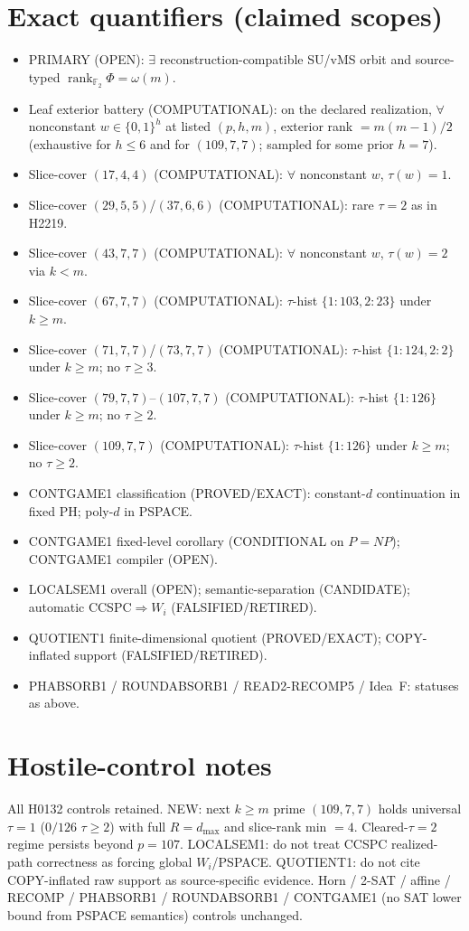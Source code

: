 \documentclass[11pt]{article}
\begin{document}
\section*{Exact quantifiers (claimed scopes)}
\begin{itemize}
\item PRIMARY (OPEN): $\exists$ reconstruction-compatible SU/vMS orbit and source-typed
  $\operatorname{rank}_{\mathbb F_2}\Phi=\omega(m)$.
\item Leaf exterior battery (COMPUTATIONAL): on the declared realization, $\forall$ nonconstant
  $w\in\{0,1\}^h$ at listed $(p,h,m)$, exterior rank $=m(m-1)/2$
  (exhaustive for $h\le6$ and for $(109,7,7)$; sampled for some prior $h{=}7$).
\item Slice-cover $(17,4,4)$ (COMPUTATIONAL): $\forall$ nonconstant $w$, $\tau(w)=1$.
\item Slice-cover $(29,5,5)$/$(37,6,6)$ (COMPUTATIONAL): rare $\tau{=}2$ as in H2219.
\item Slice-cover $(43,7,7)$ (COMPUTATIONAL): $\forall$ nonconstant $w$, $\tau(w)=2$ via $k{<}m$.
\item Slice-cover $(67,7,7)$ (COMPUTATIONAL): $\tau$-hist $\{1{:}103,2{:}23\}$ under $k{\ge}m$.
\item Slice-cover $(71,7,7)$/$(73,7,7)$ (COMPUTATIONAL): $\tau$-hist $\{1{:}124,2{:}2\}$ under $k{\ge}m$;
  no $\tau{\ge}3$.
\item Slice-cover $(79,7,7)$--$(107,7,7)$ (COMPUTATIONAL): $\tau$-hist $\{1{:}126\}$ under $k{\ge}m$;
  no $\tau{\ge}2$.
\item Slice-cover $(109,7,7)$ (COMPUTATIONAL): $\tau$-hist $\{1{:}126\}$ under $k{\ge}m$;
  no $\tau{\ge}2$.
\item CONTGAME1 classification (PROVED/EXACT): constant-$d$ continuation in fixed PH;
  poly-$d$ in PSPACE.
\item CONTGAME1 fixed-level corollary (CONDITIONAL on $P=NP$); CONTGAME1 compiler (OPEN).
\item LOCALSEM1 overall (OPEN); semantic-separation (CANDIDATE); automatic CCSPC$\Rightarrow W_i$ (FALSIFIED/RETIRED).
\item QUOTIENT1 finite-dimensional quotient (PROVED/EXACT); COPY-inflated support (FALSIFIED/RETIRED).
\item PHABSORB1 / ROUNDABSORB1 / READ2-RECOMP5 / Idea~F: statuses as above.
\end{itemize}

\section*{Hostile-control notes}
All H0132 controls retained. NEW: next $k{\ge}m$ prime $(109,7,7)$ holds universal
$\tau{=}1$ ($0/126$ $\tau{\ge}2$) with full $R{=}d_{\max}$ and slice-rank min $=4$.
Cleared-$\tau{=}2$ regime persists beyond $p{=}107$. LOCALSEM1: do not treat CCSPC
realized-path correctness as forcing global $W_i$/PSPACE. QUOTIENT1: do not cite COPY-inflated
raw support as source-specific evidence. Horn / 2-SAT / affine /
RECOMP / PHABSORB1 / ROUNDABSORB1 / CONTGAME1 (no SAT lower bound from PSPACE semantics)
controls unchanged.
\end{document}

